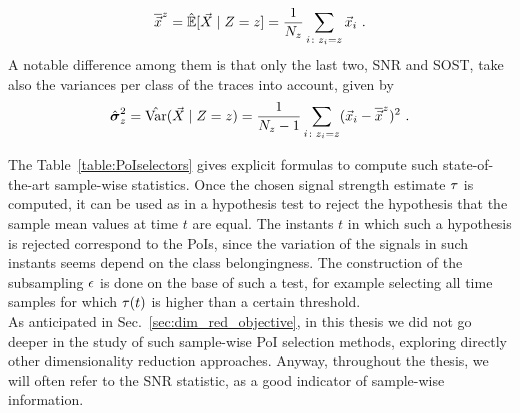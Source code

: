 \begin{equation}\label{eq:mmmXclass}
\mmmXclass= \esperEst[\given{\vaLeakVec}{\sensRandVar = \sensVar}] = \frac{1}{\nbTracesPerClass}\sum_{i\colon \sensVar_i=\sensVar} \vLeakVec_i  \mbox{ .}
\end{equation} 
A notable difference among them is that only the last two, SNR and SOST, take also the variances per class of the traces into account, given by
\begin{equation}
\varXclass = \varEst(\given{\vaLeakVec}{\sensRandVar = \sensVar}) = \frac{1}{\nbTracesPerClass-1}\sum_{i\colon \sensVar_i=\sensVar} (\vLeakVec_i - \mmmXclass)^2 \mbox{ .}
\end{equation}

The Table~\ref{table:PoIselectors} gives explicit formulas to compute such state-of-the-art sample-wise statistics. Once the chosen signal strength estimate $\tau$ is computed, it can be used as in a hypothesis test to reject the hypothesis that the sample mean values at time $t$ are equal. The instants $t$ in which such a hypothesis is rejected correspond to the PoIs, since the variation of the signals in such instants seems depend on the class belongingness. The construction of the subsampling $\epsilon$ is done on the base of such a test, for example selecting all time samples for which $\tau(t)$ is higher than a certain threshold. \\

As anticipated in Sec.~\ref{sec:dim_red_objective}, in this thesis we did not go deeper in the study of such sample-wise PoI selection methods, exploring directly other dimensionality reduction approaches. Anyway, throughout the thesis, we will often refer to the SNR statistic, as a good indicator of sample-wise information.

